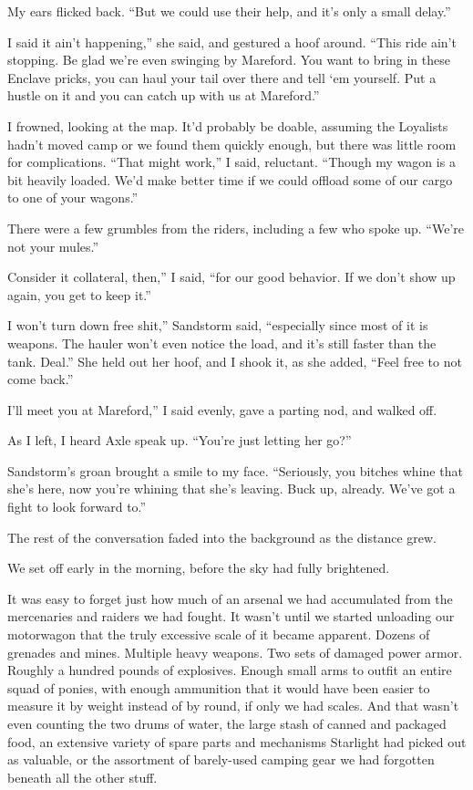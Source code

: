 My ears flicked back. “But we could use their help, and it’s only a small delay.”

\leavevmode{}I said it ain’t happening,” she said, and gestured a hoof around. “This ride ain’t stopping. Be glad we’re even swinging by Mareford. You want to bring in these Enclave pricks, you can haul your tail over there and tell ‘em yourself. Put a hustle on it and you can catch up with us at Mareford.”

I frowned, looking at the map. It’d probably be doable, assuming the Loyalists hadn’t moved camp or we found them quickly enough, but there was little room for complications. “That might work,” I said, reluctant. “Though my wagon is a bit heavily loaded. We’d make better time if we could offload some of our cargo to one of your wagons.”

There were a few grumbles from the riders, including a few who spoke up. “We’re not your mules.”

\leavevmode{}Consider it collateral, then,” I said, “for our good behavior. If we don’t show up again, you get to keep it.”

\leavevmode{}I won’t turn down free shit,” Sandstorm said, “especially since most of it is weapons. The hauler won’t even notice the load, and it’s still faster than the tank. Deal.” She held out her hoof, and I shook it, as she added, “Feel free to not come back.”

\leavevmode{}I’ll meet you at Mareford,” I said evenly, gave a parting nod, and walked off.

As I left, I heard Axle speak up. “You’re just letting her go?”

Sandstorm’s groan brought a smile to my face. “Seriously, you bitches whine that she’s here, now you’re whining that she’s leaving. Buck up, already. We’ve got a fight to look forward to.”

The rest of the conversation faded into the background as the distance grew.

{\br}%
We set off early in the morning, before the sky had fully brightened.

It was easy to forget just how much of an arsenal we had accumulated from the mercenaries and raiders we had fought. It wasn’t until we started unloading our motorwagon that the truly excessive scale of it became apparent. Dozens of grenades and mines. Multiple heavy weapons. Two sets of damaged power armor. Roughly a hundred pounds of explosives. Enough small arms to outfit an entire squad of ponies, with enough ammunition that it would have been easier to measure it by weight instead of by round, if only we had scales. And that wasn’t even counting the two drums of water, the large stash of canned and packaged food, an extensive variety of spare parts and mechanisms Starlight had picked out as valuable, or the assortment of barely-used camping gear we had forgotten beneath all the other stuff.


